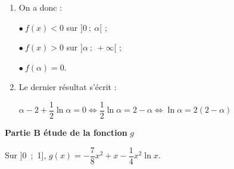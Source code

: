 \begin{enumerate}
\begin{enumerate}
Comme $f(1) = 1 - 2 + 0,5\times \ln 1 = -1$ et 

\phantom{Comme}$f(2) = 2 - 2  + \dfrac{\ln 2}{2} = \dfrac{\ln 2}{2} > 0$, le même théorème appliqué à l'intervalle [1~;~2] montre que $\alpha \in [1~;~2]$.
		\item On a donc :
		
$\bullet~f(x) < 0$ sur $]0~;~\alpha[$ ;  
		
$\bullet~f(x) > 0$ sur $]\alpha~;~+ \infty[$ ;

$\bullet~f(\alpha)  = 0$.
		\item Le dernier résultat s'écrit :
		
$\alpha - 2 +\dfrac12 \ln \alpha = 0 \iff \dfrac12 \ln \alpha = 2 - \alpha \iff \ln \alpha = 2(2 - \alpha)$
	\end{enumerate}
\end{enumerate}

\medskip

\textbf{Partie B étude de la fonction}{} \boldmath $g$\unboldmath 

Sur ]0~;~1], \quad $g(x) = - \dfrac78 x^2 + x - \dfrac14 x^2\ln x$.

\medskip

